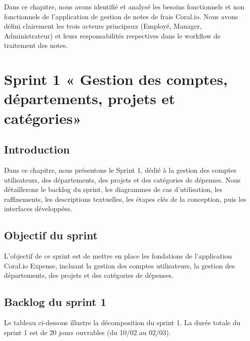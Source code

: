 \documentclass[12pt,a4paper]{report}
\let\oldchapter\chapter
\def\chapter{\clearpage\setcounter{section}{0}\oldchapter}
\begin{document}

Dans ce chapitre, nous avons identifié et analysé les besoins fonctionnels et non fonctionnels de l'application de gestion de notes de frais Coral.io. Nous avons défini clairement les trois acteurs principaux (Employé, Manager, Administrateur) et leurs responsabilités respectives dans le workflow de traitement des notes.



\newpage

\chapter{Sprint 1 « Gestion des comptes, départements, projets et catégories»}



\section*{Introduction}


Dans ce chapitre, nous présentons le Sprint 1, dédié à la gestion des comptes utilisateurs, des départements, des projets et des catégories de dépenses. Nous détaillerons le backlog du sprint, les diagrammes de cas d'utilisation, les raffinements, les descriptions textuelles, les étapes clés de la conception, puis les interfaces développées.



\section{Objectif du sprint}

L'objectif de ce sprint est de mettre en place les fondations de l'application Coral.io Expense, incluant la gestion des comptes utilisateurs, la gestion des départements, des projets et des catégories de dépenses.





\section{Backlog du sprint 1}





Le tableau ci-dessous illustre la décomposition du sprint 1. La durée totale du sprint 1 est de 20 jours ouvrables (du 10/02 au 02/03).
\end{document}
